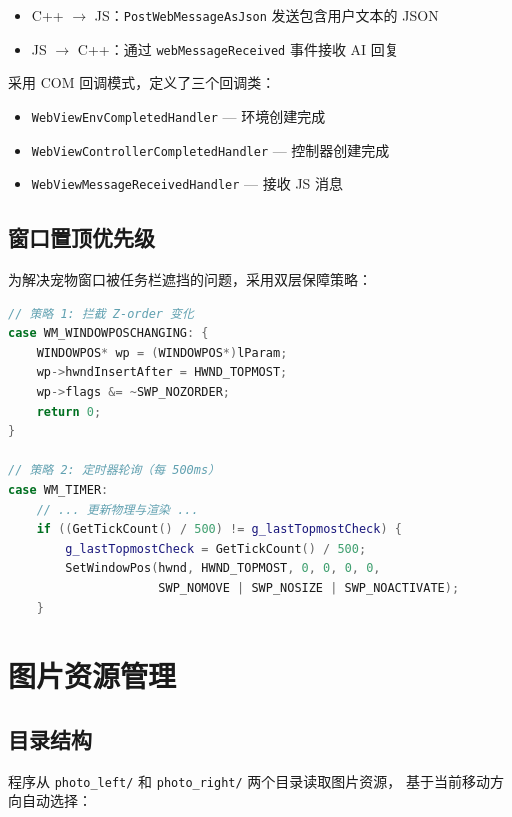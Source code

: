 \documentclass[12pt,a4paper]{ctexart}
\begin{document}
\begin{itemize}
    \item C++ $\to$ JS：\texttt{PostWebMessageAsJson} 发送包含用户文本的 JSON
    \item JS $\to$ C++：通过 \texttt{webMessageReceived} 事件接收 AI 回复
\end{itemize}

采用 COM 回调模式，定义了三个回调类：
\begin{itemize}
    \item \texttt{WebViewEnvCompletedHandler} --- 环境创建完成
    \item \texttt{WebViewControllerCompletedHandler} --- 控制器创建完成
    \item \texttt{WebViewMessageReceivedHandler} --- 接收 JS 消息
\end{itemize}

\subsection{窗口置顶优先级}

为解决宠物窗口被任务栏遮挡的问题，采用双层保障策略：

\begin{lstlisting}[caption={强制置顶实现},language=C++]
// 策略 1: 拦截 Z-order 变化
case WM_WINDOWPOSCHANGING: {
    WINDOWPOS* wp = (WINDOWPOS*)lParam;
    wp->hwndInsertAfter = HWND_TOPMOST;
    wp->flags &= ~SWP_NOZORDER;
    return 0;
}

// 策略 2: 定时器轮询（每 500ms）
case WM_TIMER:
    // ... 更新物理与渲染 ...
    if ((GetTickCount() / 500) != g_lastTopmostCheck) {
        g_lastTopmostCheck = GetTickCount() / 500;
        SetWindowPos(hwnd, HWND_TOPMOST, 0, 0, 0, 0,
                     SWP_NOMOVE | SWP_NOSIZE | SWP_NOACTIVATE);
    }
\end{lstlisting}

\section{图片资源管理}

\subsection{目录结构}

程序从 \texttt{photo\_left/} 和 \texttt{photo\_right/} 两个目录读取图片资源，
基于当前移动方向自动选择：
\end{document}
